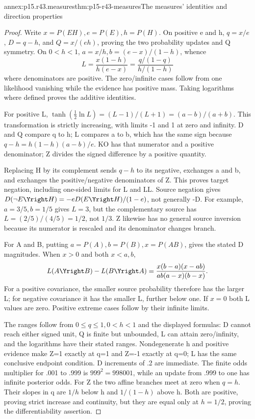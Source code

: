 \begin{annexitem}{annex:p15.r43.measures}{thm:p15-r43-measures}{The measures' identities and direction properties}
\begin{proof}
Write \(x=P(EH),e=P(E),h=P(H)\). On positive e and h,
\(q=x/e\), \(D=q-h\), and \(Q=x/(eh)\), proving the two
probability updates and Q symmetry. On \(0<h<1\),
\(a=x/h,b=(e-x)/(1-h)\), whence
\[
 L=\frac{x(1-h)}{h(e-x)}
   =\frac{q/(1-q)}{h/(1-h)}
\]
where denominators are positive. The zero/infinite cases follow from
one likelihood vanishing while the evidence has positive mass.
Taking logarithms where defined proves the additive identities.

For positive L,
\(\tanh(\frac12\ln L)=(L-1)/(L+1)=(a-b)/(a+b)\).
This transformation is strictly increasing, with limits -1 and 1
at zero and infinity. D and Q compare q to h; L compares a to b,
which has the same sign because
\(q-h=h(1-h)(a-b)/e\). KO has that numerator and a positive
denominator; Z divides the signed difference by a positive quantity.

Replacing H by its complement sends \(q-h\) to its negative, exchanges
a and b, and exchanges the positive/negative denominators of Z.
This proves target negation, including one-sided limits for L and LL.
Source negation gives
\(D(\neg E\Yright H)=-eD(E\Yright H)/(1-e)\), not generally -D.
For example, \(a=3/5,b=1/5\) gives \(L=3\), but the complementary source
has \(L=(2/5)/(4/5)=1/2\), not \(1/3\). Z likewise has no general source
inversion because its numerator is rescaled and its denominator changes
branch.

For A and B, putting \(a=P(A),b=P(B),x=P(AB)\), gives
the stated D magnitudes. When \(x>0\) and both \(x<a,b\),
\[
 L(A\Yright B)-L(B\Yright A)
 =\frac{x(b-a)(x-ab)}{ab(a-x)(b-x)}.
\]
For a positive covariance, the smaller source probability therefore
has the larger L; for negative covariance it has the smaller L,
further below one. If \(x=0\) both L values are zero. Positive extreme
cases follow by their infinite limits.

The ranges follow from \(0\leq q\leq1,0<h<1\) and the
displayed formulas: D cannot reach either signed unit, Q is finite
but unbounded, L can attain zero/infinity, and the logarithms have
their stated ranges. Nondegenerate h and positive evidence make
Z=1 exactly at q=1 and Z=-1 exactly at q=0; L has the same
conclusive endpoint condition. D increments of .2 are immediate.
The finite odds multiplier for .001 to .999 is \(999^2=998001\),
while an update from .999 to one has infinite posterior odds.
For Z the two affine branches meet at zero when \(q=h\). Their
slopes in q are \(1/h\) below h and \(1/(1-h)\) above h.
Both are positive, proving strict increase and continuity, but they
are equal only at \(h=1/2\), proving the differentiability assertion.
\end{proof}
\end{annexitem}

